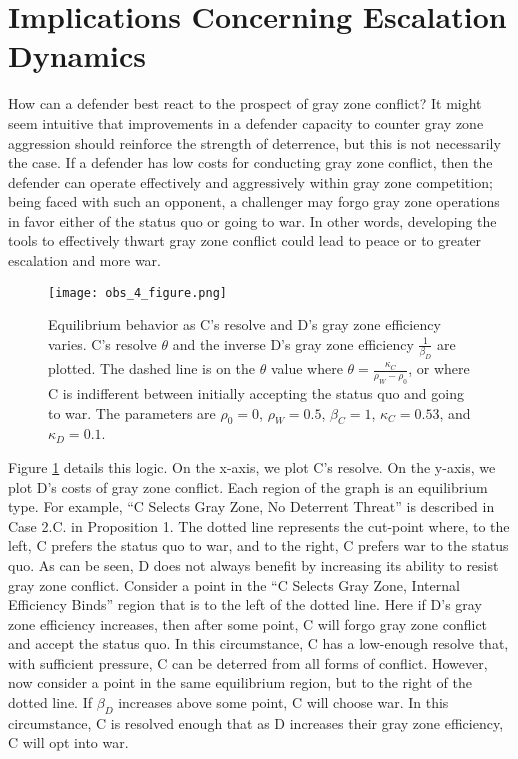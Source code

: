 \documentclass[
]{article}
\begin{document}
\hypertarget{implications-concerning-escalation-dynamics}{%
\section{Implications Concerning Escalation Dynamics}\label{implications-concerning-escalation-dynamics}}

How can a defender best react to the prospect of gray zone conflict? It might seem intuitive that improvements in a defender capacity to counter gray zone aggression should reinforce the strength of deterrence, but this is not necessarily the case. If a defender has low costs for conducting gray zone conflict, then the defender can operate effectively and aggressively within gray zone competition; being faced with such an opponent, a challenger may forgo gray zone operations in favor either of the status quo or going to war. In other words, developing the tools to effectively thwart gray zone conflict could lead to peace or to greater escalation and more war.

\begin{figure}[h]
      \centering
        \texttt{[image: obs\_4\_figure.png]}
        \caption{Equilibrium behavior as C's resolve and D's gray zone efficiency varies. C's resolve $\theta$ and the inverse D's gray zone efficiency $\frac{1}{\beta_D}$ are plotted. The dashed line is on the $\theta$ value where $\theta=\frac{\kappa_{C}}{\rho_W-\rho_0}$, or where C is indifferent between initially accepting the status quo and going to war. The parameters are $\rho_0=0$, $\rho_W=0.5$, $\beta_C=1$, $\kappa_{C}=0.53$, and $\kappa_D=0.1$.}
    \label{fig:equilibrium}
    \end{figure}

Figure \ref{fig:equilibrium} details this logic. On the x-axis, we plot C's resolve. On the y-axis, we plot D's costs of gray zone conflict. Each region of the graph is an equilibrium type. For example, ``C Selects Gray Zone, No Deterrent Threat'' is described in Case 2.C. in Proposition 1. The dotted line represents the cut-point where, to the left, C prefers the status quo to war, and to the right, C prefers war to the status quo. As can be seen, D does not always benefit by increasing its ability to resist gray zone conflict. Consider a point in the ``C Selects Gray Zone, Internal Efficiency Binds'' region that is to the left of the dotted line. Here if D's gray zone efficiency increases, then after some point, C will forgo gray zone conflict and accept the status quo. In this circumstance, C has a low-enough resolve that, with sufficient pressure, C can be deterred from all forms of conflict. However, now consider a point in the same equilibrium region, but to the right of the dotted line. If \(\beta_{D}\) increases above some point, C will choose war. In this circumstance, C is resolved enough that as D increases their gray zone efficiency, C will opt into war.
\end{document}
